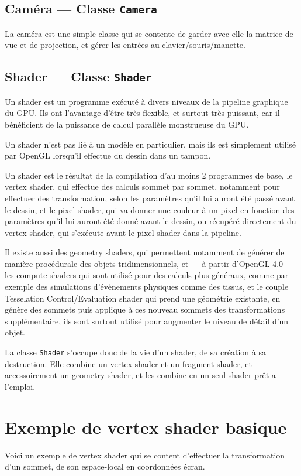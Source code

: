 \documentclass[11pt, a4paper, titlepage]{article}
\begin{document}
\subsection{Caméra --- Classe \texttt{Camera}}

La caméra est une simple classe qui se contente de garder avec elle la
matrice de vue et de projection, et gérer les entrées au
clavier/souris/manette.

\subsection{Shader --- Classe \texttt{Shader}}

Un shader est un programme exécuté à divers niveaux de la pipeline
graphique du GPU.  Ils ont l'avantage d'être très flexible, et surtout
très puissant, car il bénéficient de la puissance de calcul parallèle
monstrueuse du GPU.

Un shader n'est pas lié à un modèle en particulier, mais ils est
simplement utilisé par OpenGL lorsqu'il effectue du dessin dans un
tampon.

Un shader est le résultat de la compilation d'au moins 2 programmes de
base, le vertex shader, qui effectue des calculs sommet par sommet,
notamment pour effectuer des transformation, selon les paramètres
qu'il lui auront été passé avant le dessin, et le pixel shader, qui va
donner une couleur à un pixel en fonction des paramètres qu'il lui
auront été donné avant le dessin, ou récupéré directement du vertex
shader, qui s'exécute avant le pixel shader dans la pipeline.

Il existe aussi des geometry shaders, qui permettent notamment de
générer de manière procédurale des objets tridimensionnels, et --- à
partir d'OpenGL 4.0 --- les compute shaders qui sont utilisé pour des
calculs plus généraux, comme par exemple des simulations d'évènements
physiques comme des tissus, et le couple Tesselation
Control/Evaluation shader qui prend une géométrie existante, en génère
des sommets puis applique à ces nouveau sommets des transformations
supplémentaire, ils sont surtout utilisé pour augmenter le niveau de
détail d'un objet.

La classe \texttt{Shader} s'occupe donc de la vie d'un shader, de sa
création à sa destruction.  Elle combine un vertex shader et un
fragment shader, et accessoirement un geometry shader, et les combine
en un seul shader prêt a l'emploi.

\pagebreak

\section{Exemple de vertex shader basique}
Voici un exemple de vertex shader qui se content d'effectuer la
transformation d'un sommet, de son espace-local en coordonnées écran.
\end{document}
